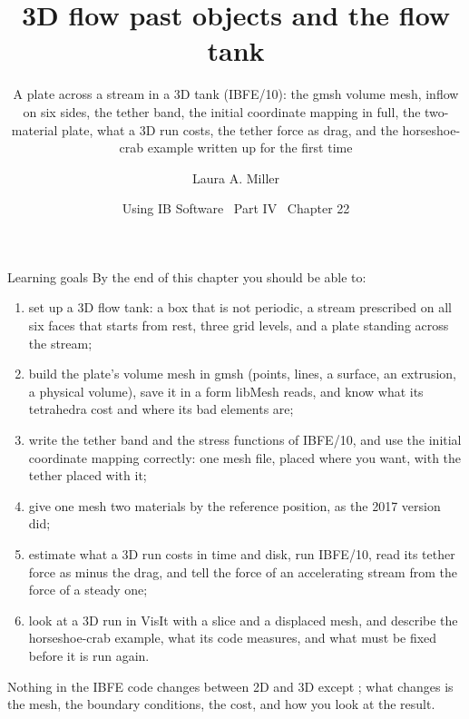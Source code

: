 \documentclass[aspectratio=169,11pt]{beamer}
\title[3D flow past objects]{3D flow past objects and the flow tank}
\subtitle{A plate across a stream in a 3D tank (IBFE/10): the gmsh volume mesh, inflow on six sides, the tether band, the initial coordinate mapping in full, the two-material plate, what a 3D run costs, the tether force as drag, and the horseshoe-crab example written up for the first time}
\author[Miller]{Laura A. Miller}
\institute[UArizona]{Department of Mathematics, University of Arizona}
\date{Using IB Software \textbullet\ Part IV \textbullet\ Chapter 22}
\begin{document}
\begin{frame}[plain]
\end{frame}

\begin{frame}{Learning goals}
\label{fr:goals}
\footnotesize By the end of this chapter you should be able to:
\begin{enumerate}
  \item set up a 3D flow tank: a box that is not periodic, a stream prescribed on all six faces that starts from rest, three grid levels, and a plate standing across the stream;
  \item build the plate's volume mesh in gmsh (points, lines, a surface, an extrusion, a physical volume), save it in a form libMesh reads, and know what its tetrahedra cost and where its bad elements are;
  \item write the tether band and the stress functions of IBFE/10, and use the initial coordinate mapping correctly: one mesh file, placed where you want, with the tether placed with it;
  \item give one mesh two materials by the reference position, as the 2017 version did;
  \item estimate what a 3D run costs in time and disk, run IBFE/10, read its tether force as minus the drag, and tell the force of an accelerating stream from the force of a steady one;
  \item look at a 3D run in VisIt with a slice and a displaced mesh, and describe the horseshoe-crab example, what its code measures, and what must be fixed before it is run again.
\end{enumerate}
\begin{punchbox}
\footnotesize Nothing in the IBFE code changes between 2D and 3D except ; what changes is the mesh, the boundary conditions, the cost, and how you look at the result.
\end{punchbox}
\end{frame}
\end{document}
